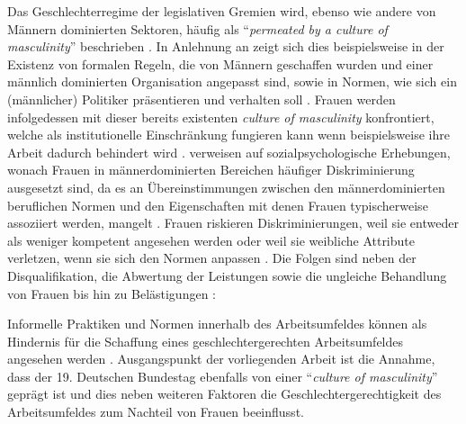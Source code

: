 \documentclass[12pt, 
    twoside=false, 
    bibliography=totoc, 
    numbers=endperiod, 
    headings=normal, 
    toc=chapterentrydotfill
    ]{scrbook}
\begin{document}
Das Geschlechterregime der legislativen Gremien wird, ebenso wie andere von Männern dominierten Sektoren, häufig als \enquote{\emph{permeated by a culture of masculinity}} beschrieben \parencites[200]{erikson_2018}{lovenduski_2005}.
In Anlehnung an \textcite{acker_1990} zeigt sich dies beispielsweise in der Existenz von formalen Regeln, die von Männern geschaffen wurden und einer männlich dominierten Organisation angepasst sind, sowie in Normen, wie sich ein (männlicher) Politiker präsentieren und verhalten soll \parencites[200]{erikson_2018}[48]{acker_1990}. Frauen werden infolgedessen mit dieser bereits existenten \emph{culture of masculinity} konfrontiert, welche als institutionelle Einschränkung fungieren kann wenn beispielsweise ihre Arbeit dadurch behindert wird \parencites[200]{erikson_2018}[47-56]{lovenduski_2005}. \textcite{erikson_2018} verweisen auf sozialpsychologische Erhebungen, wonach Frauen in männerdominierten Bereichen häufiger Diskriminierung ausgesetzt sind, da es an Übereinstimmungen zwischen den männerdominierten beruflichen Normen und den Eigenschaften mit denen Frauen typischerweise assoziiert werden, mangelt \parencites[vgl.][]{burgess_1999}{eagly_2002}{heilman_2001}{heilman_2004}. 
%
Frauen riskieren Diskriminierungen, weil sie entweder als weniger kompetent angesehen werden oder weil sie weibliche Attribute verletzen, wenn sie sich den Normen anpassen \parencite[200]{erikson_2018}. Die Folgen sind neben der Disqualifikation, die Abwertung der Leistungen sowie die ungleiche Behandlung von Frauen bis hin zu Belästigungen \parencites[200]{erikson_2018}{heilman_2001}{burgess_1999}:
%
\citereset
\begin{quote}
      \parencite[200]{erikson_2018}
\end{quote}

Informelle Praktiken und Normen innerhalb des Arbeitsumfeldes können als Hindernis für die Schaffung eines geschlechtergerechten Arbeitsumfeldes angesehen werden \parencite[200]{erikson_2018}. Ausgangspunkt der vorliegenden Arbeit ist die Annahme, dass der 19. Deutschen Bundestag ebenfalls von einer \enquote{\emph{culture of masculinity}} geprägt ist und dies neben weiteren Faktoren die Geschlechtergerechtigkeit des Arbeitsumfeldes zum Nachteil von Frauen beeinflusst.  
\end{document}
